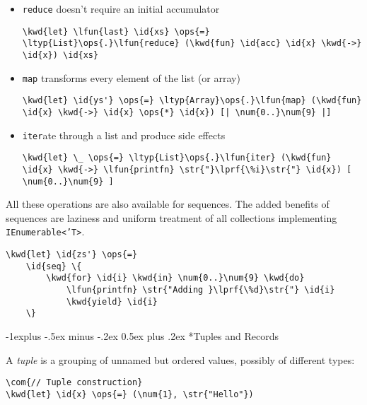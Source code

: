 \documentclass[10pt,landscape]{article}
\makeatletter
\renewcommand{\subsection}{\@startsection{subsection}{2}{0mm}%
                                {-1explus -.5ex minus -.2ex}%
                                {0.5ex plus .2ex}%
                                {\normalfont\normalsize\bfseries}}
\newcommand{\id}[1]{\textcolor[HTML]{000000}{#1}}
\newcommand{\str}[1]{\textcolor[HTML]{A31515}{#1}}
\newcommand{\kwd}[1]{\textcolor[HTML]{0000FF}{#1}}
\newcommand{\com}[1]{\textcolor[HTML]{008000}{#1}}
\newcommand{\ops}[1]{\textcolor[HTML]{000000}{#1}}
\newcommand{\num}[1]{\textcolor[HTML]{000000}{#1}}
\newcommand{\ltyp}[1]{\textcolor[HTML]{2B91AF}{#1}}
\newcommand{\lfun}[1]{\textcolor[HTML]{0000A0}{#1}}
\newcommand{\lprf}[1]{\textcolor[HTML]{2B91AF}{#1}}
\makeatother
\begin{document}
\begin{multicols}{3}
\begin{itemize}
\item 

\texttt{reduce} doesn't require an initial accumulator
\begin{Verbatim}[commandchars=\\\{\}]
\kwd{let} \lfun{last} \id{xs} \ops{=} \ltyp{List}\ops{.}\lfun{reduce} (\kwd{fun} \id{acc} \id{x} \kwd{->} \id{x}) \id{xs}
\end{Verbatim}


\item 

\texttt{map} transforms every element of the list (or array)
\begin{Verbatim}[commandchars=\\\{\}]
\kwd{let} \id{ys'} \ops{=} \ltyp{Array}\ops{.}\lfun{map} (\kwd{fun} \id{x} \kwd{->} \id{x} \ops{*} \id{x}) [| \num{0..}\num{9} |]
\end{Verbatim}


\item 

\texttt{iter}ate through a list and produce side effects
\begin{Verbatim}[commandchars=\\\{\}]
\kwd{let} \_ \ops{=} \ltyp{List}\ops{.}\lfun{iter} (\kwd{fun} \id{x} \kwd{->} \lfun{printfn} \str{"}\lprf{\%i}\str{"} \id{x}) [ \num{0..}\num{9} ] 
\end{Verbatim}


\end{itemize}



All these operations are also available for sequences. The added benefits of sequences are laziness and uniform treatment of all collections implementing \texttt{IEnumerable<'T>}.
\begin{Verbatim}[commandchars=\\\{\}]
\kwd{let} \id{zs'} \ops{=}
    \id{seq} \{ 
        \kwd{for} \id{i} \kwd{in} \num{0..}\num{9} \kwd{do}
            \lfun{printfn} \str{"Adding }\lprf{\%d}\str{"} \id{i}
            \kwd{yield} \id{i}
    \}

\end{Verbatim}

\subsection*{Tuples and Records}



A \emph{tuple} is a grouping of unnamed but ordered values, possibly of different types:
\begin{Verbatim}[commandchars=\\\{\}]
\com{// Tuple construction}
\kwd{let} \id{x} \ops{=} (\num{1}, \str{"Hello"})


\end{Verbatim}
\end{multicols}
\end{document}

